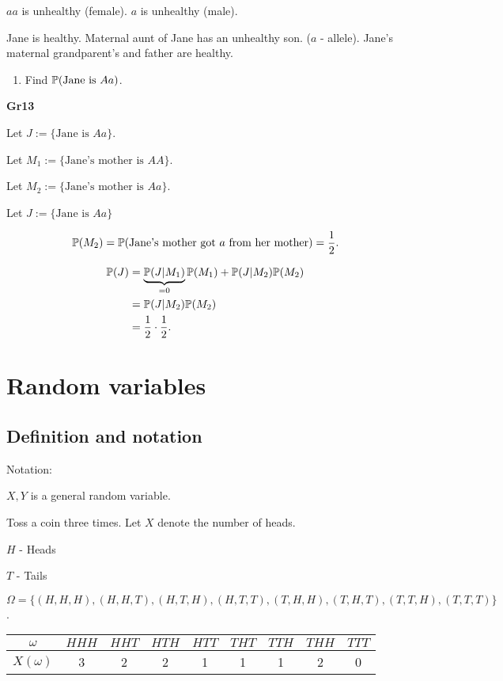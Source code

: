 \documentclass[10pt, a4paper]{article}
\begin{document}
\begin{example}
    $aa$ is unhealthy (female).
    $a$ is unhealthy (male).
    
    Jane is healthy. Maternal aunt of Jane has an unhealthy son. ($a$ - allele). Jane's maternal grandparent's and father are healthy.
    \begin{enumerate}[label = (\roman*)]
        \item Find $\P(\text{Jane is } Aa)$.
    \end{enumerate}

    \textbf{Gr13}
    
    Let $J := \{\text{Jane is } Aa\}$.
    
    Let $M_1 := \{\text{Jane's mother is } AA\}$.
    
    Let $M_2 := \{\text{Jane's mother is } Aa\}$.

    Let $J := \{\text{Jane is } Aa\}$

    \[
    \P(M_2) = \P(\text{Jane's mother got $a$ from her mother}) = \frac{1}{2}.
    \]
    
    \begin{align*}
    \P(J) &= \underbrace{\P(J | M_1)}_{= 0}\P(M_1) + \P(J | M_2)\P(M_2) \\
    &= \P(J | M_2)\P(M_2) \\
    &= \frac{1}{2} \cdot \frac{1}{2}.
    \end{align*}
\end{example}

\newpage

\section{Random variables}

\subsection{Definition and notation}

Notation:

$X, Y$ is a general random variable.

\begin{example}[label = exmp1]
    Toss a coin three times. Let $X$ denote the number of heads.

    $H$ - Heads
    
    $T$ - Tails

    $\Omega = \{(H, H, H), (H, H, T), (H, T, H), (H, T, T), (T, H, H), (T, H, T), (T, T, H), (T, T, T)\}$.

    \begin{table}[h!]
        \centering
        \begin{tabular}{c|cccccccc}
             $\omega$ & $HHH$ & $HHT$ & $HTH$ & $HTT$ & $THT$ & $TTH$ & $THH$ & $TTT$ \\
             \hline
             $X(\omega)$ & 3 & 2 & 2 & 1 & 1 & 1 & 2 & 0 
        \end{tabular}
    \end{table}
\end{example}
\end{document}
